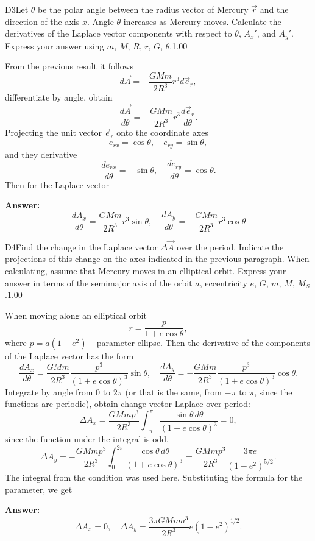 \documentclass[11pt,a4paper]{article}
\begin{document}
\begin{solcard}{D3}{Let $\theta$ be the polar angle between the radius vector of Mercury $\vec{r}$ and the direction of the axis $x$. Angle $\theta$ increases as Mercury moves. Calculate the derivatives of the Laplace vector components with respect to $\theta$, $A_x'$, and $A_y'$. Express your answer using $m$, $M$, $R$, $r$, $G$, $\theta$.}{1.00}

From the previous result it follows $$ d \vec{A} = - \frac{GMm}{2 R^3} r^3 d \vec{e}_r, $$differentiate by angle, obtain $$ \frac{d \vec{A}}{d\theta} = - \frac{GMm}{2 R^3} r^3\frac{d \vec{e}_r}{d\theta}. $$Projecting the unit vector $\vec{e}_r$ onto the coordinate axes $$ e_{rx} = \cos \theta, \quad e_{r y} = \sin \theta, $$and they derivative $$ \frac{d e_{rx}}{d\theta}  = - \sin\theta, \quad \frac{d e_{ry}}{d\theta} = \cos \theta. $$Then for the Laplace vector

\par\smallskip\noindent\textbf{Answer:} $$ \frac{d A_x}{d\theta} =  \frac{GMm}{2 R^3} r^3 \sin \theta, \quad \frac{d A_y}{d\theta} =   - \frac{GMm}{2 R^3} r^3 \cos \theta $$
\end{solcard}

\begin{solcard}{D4}{Find the change in the Laplace vector $\Delta \vec{A}$ over the period. Indicate the projections of this change on the axes indicated in the previous paragraph. When calculating, assume that Mercury moves in an elliptical orbit. Express your answer in terms of the semimajor axis of the orbit $a$, eccentricity $e$, $G$, $m$, $M$, $M_S$.}{1.00}

When moving along an elliptical orbit $$ r = \frac{p} {1 + e \cos \theta}, $$where $p = a(1 - e^2)$ – parameter ellipse. Then the derivative of the components of the Laplace vector has the form $$ \frac{d A_x}{d\theta} =  \frac{GMm}{2 R^3} \frac{p^3}{(1 + e\cos \theta)^3} \sin \theta, \quad \frac{d A_y}{d\theta} =   - \frac{GMm}{2 R^3} \frac{p^3}{(1 + e\cos \theta)^3} \cos \theta. $$Integrate by angle from $0$ to $2 \pi $ (or that is the same, from $-\pi$ to $\pi$, since the functions are periodic), obtain change vector Laplace over period: $$ \Delta A_x = \frac{GM mp^3}{2 R^3} \int_{-\pi}^{\pi} \frac{\sin \theta \, d \theta}{(1 + e \cos \theta)^3} = 0, $$since the function under the integral is odd, $$ \Delta A_y =- \frac{GM mp^3}{2 R^3} \int_{0}^{2 \pi} \frac{\cos \theta \, d \theta}{(1 + e \cos \theta)^3} = \frac{GM mp^3}{2 R^3} \frac{3 \pi e}{(1- e^2)^{5/2}}. $$The integral from the condition was used here. Substituting the formula for the parameter, we get

\par\smallskip\noindent\textbf{Answer:} $$ \Delta A_x = 0, \quad \Delta A_y = \frac{3 \pi GM m a^3}{2 R^3}  e(1- e^2)^{1/2}. $$
\end{solcard}
\end{document}
